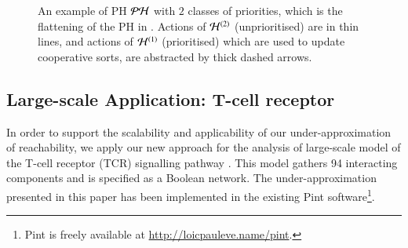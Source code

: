 \begin{figure}[htp]
  \centering
  \caption{
  \label{fig:metazoan-ph}
    An example of PH $\mathcal{PH}$ with $2$ classes of priorities,
    which is the flattening of the PH in .
    Actions of $\mathcal{H}^{(2)}$ (unprioritised) are in thin lines,
    and actions of $\mathcal{H}^{(1)}$ (prioritised) which are used to update cooperative sorts,
    are abstracted by thick dashed arrows.
  }
\end{figure}

\subsection{Large-scale Application: T-cell receptor}

In order to support the scalability and applicability of our under-approximation of reachability, we
apply our new approach for the analysis of large-scale model of the T-cell receptor (TCR)
signalling pathway \cite{tcrsig94}.
This model gathers 94 interacting components and is specified as a Boolean network.
The under-approximation presented in this paper has been implemented in the existing Pint
software\footnote{Pint is freely available at \url{http://loicpauleve.name/pint}.}.

